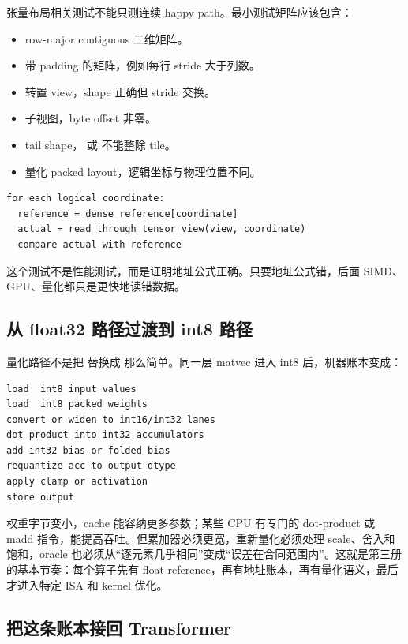 张量布局相关测试不能只测连续 happy path。最小测试矩阵应该包含：

\begin{itemize}
  \item row-major contiguous 二维矩阵。
  \item 带 padding 的矩阵，例如每行 stride 大于列数。
  \item 转置 view，shape 正确但 stride 交换。
  \item 子视图，byte offset 非零。
  \item tail shape， 或  不能整除 tile。
  \item 量化 packed layout，逻辑坐标与物理位置不同。
\end{itemize}

\begin{lstlisting}[numbers=none,caption={layout oracle 的基本做法}]
for each logical coordinate:
  reference = dense_reference[coordinate]
  actual = read_through_tensor_view(view, coordinate)
  compare actual with reference
\end{lstlisting}

这个测试不是性能测试，而是证明地址公式正确。只要地址公式错，后面 SIMD、GPU、量化都只是更快地读错数据。

\subsection{从 float32 路径过渡到 int8 路径}

量化路径不是把  替换成  那么简单。同一层 matvec 进入 int8 后，机器账本变成：

\begin{lstlisting}[numbers=none,caption={int8 matvec 的机器账本变化}]
load  int8 input values
load  int8 packed weights
convert or widen to int16/int32 lanes
dot product into int32 accumulators
add int32 bias or folded bias
requantize acc to output dtype
apply clamp or activation
store output
\end{lstlisting}

权重字节变小，cache 能容纳更多参数；某些 CPU 有专门的 dot-product 或 madd 指令，能提高吞吐。但累加器必须更宽，重新量化必须处理 scale、舍入和饱和，oracle 也必须从“逐元素几乎相同”变成“误差在合同范围内”。这就是第三册的基本节奏：每个算子先有 float reference，再有地址账本，再有量化语义，最后才进入特定 ISA 和 kernel 优化。

\subsection{把这条账本接回 Transformer}

